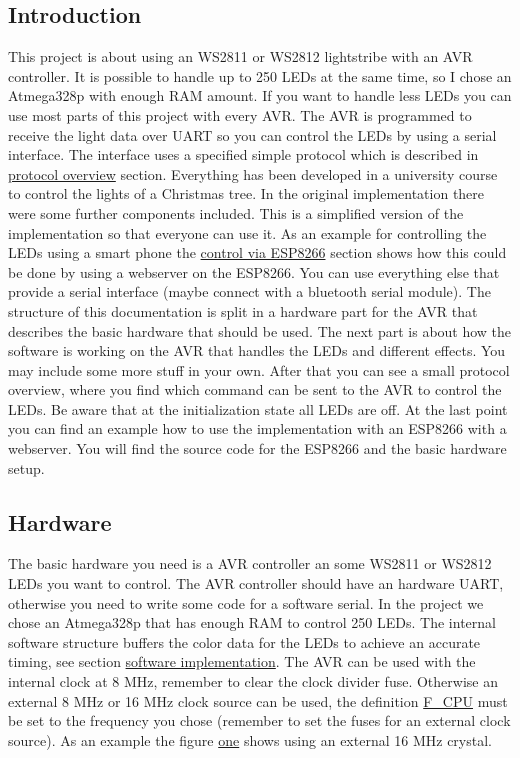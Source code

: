  \hypertarget{index_intro_sec}{}\subsection{Introduction}\label{index_intro_sec}
This project is about using an W\+S2811 or W\+S2812 lightstribe with an A\+V\+R controller. It is possible to handle up to 250 L\+E\+Ds at the same time, so I chose an Atmega328p with enough R\+A\+M amount. If you want to handle less L\+E\+Ds you can use most parts of this project with every A\+V\+R. The A\+V\+R is programmed to receive the light data over U\+A\+R\+T so you can control the L\+E\+Ds by using a serial interface. The interface uses a specified simple protocol which is described in \hyperlink{index_protocol_sec}{protocol overview} section. Everything has been developed in a university course to control the lights of a Christmas tree. In the original implementation there were some further components included. This is a simplified version of the implementation so that everyone can use it. As an example for controlling the L\+E\+Ds using a smart phone the \hyperlink{index_esp_sec}{control via E\+S\+P8266} section shows how this could be done by using a webserver on the E\+S\+P8266. You can use everything else that provide a serial interface (maybe connect with a bluetooth serial module). The structure of this documentation is split in a hardware part for the A\+V\+R that describes the basic hardware that should be used. The next part is about how the software is working on the A\+V\+R that handles the L\+E\+Ds and different effects. You may include some more stuff in your own. After that you can see a small protocol overview, where you find which command can be sent to the A\+V\+R to control the L\+E\+Ds. Be aware that at the initialization state all L\+E\+Ds are off. At the last point you can find an example how to use the implementation with an E\+S\+P8266 with a webserver. You will find the source code for the E\+S\+P8266 and the basic hardware setup.\hypertarget{index_hardware_sec}{}\subsection{Hardware}\label{index_hardware_sec}
The basic hardware you need is a A\+V\+R controller an some W\+S2811 or W\+S2812 L\+E\+Ds you want to control. The A\+V\+R controller should have an hardware U\+A\+R\+T, otherwise you need to write some code for a software serial. In the project we chose an Atmega328p that has enough R\+A\+M to control 250 L\+E\+Ds. The internal software structure buffers the color data for the L\+E\+Ds to achieve an accurate timing, see section \hyperlink{index_software_sec}{software implementation}. The A\+V\+R can be used with the internal clock at 8 M\+Hz, remember to clear the clock divider fuse. Otherwise an external 8 M\+Hz or 16 M\+Hz clock source can be used, the definition \hyperlink{globals_8h_a43bafb28b29491ec7f871319b5a3b2f8}{F\+\_\+\+C\+P\+U} must be set to the frequency you chose (remember to set the fuses for an external clock source). As an example the figure \hyperlink{index_one}{one} shows using an external 16 M\+Hz crystal. \label{index_one}%
\hypertarget{index_one}{}%

